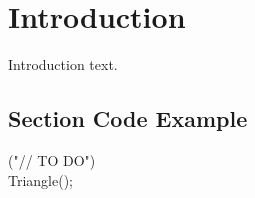     \chapter[Introduction]{Introduction}

Introduction text.

    \section{Section Code Example}

    \begin{code}{}
        \codeitem \codepragma{} \codemessage{}("// TO DO") \\
        \stepcodelevel
            \codenew{} Triangle();\\
            \prevcodelevel
    \end{code}
    \vspace{0.5\baselineskip} 